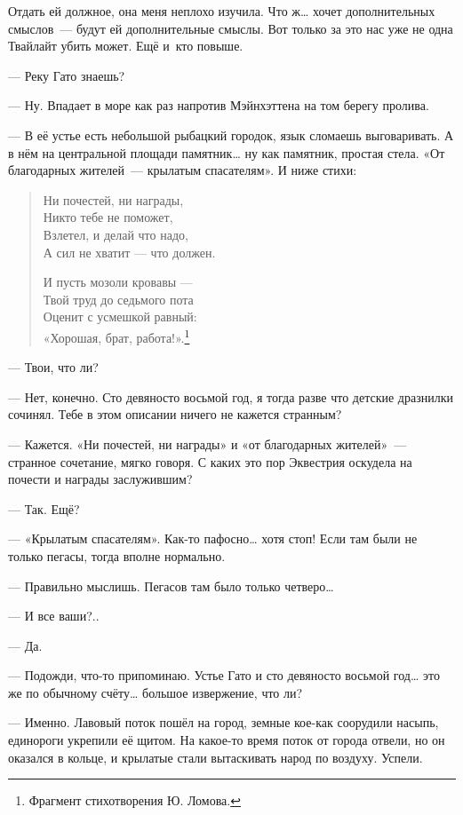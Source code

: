 \documentclass[fontsize=11pt,a5paper,titlepage=firstcover]{scrbook}
\begin{document}
Отдать ей должное, она меня неплохо изучила. Что ж{\ldots} хочет дополнительных смыслов~--- будут ей дополнительные смыслы. Вот только за это нас уже не одна Твайлайт убить может. Ещё и~кто повыше.

--- Реку Гато знаешь?

--- Ну. Впадает в море как раз напротив Мэйнхэттена на том берегу пролива.

--- В её устье есть небольшой рыбацкий городок, язык сломаешь выговаривать. А в нём на центральной площади памятник{\ldots} ну как памятник, простая стела. «От благодарных жителей~--- крылатым спасателям». И ниже стихи:

\begin{verse}
\textsf{Ни почестей, ни награды,\\
Никто тебе не поможет,\\
Взлетел, и делай что надо,\\
А сил не хватит --- что должен.}

\textsf{И пусть мозоли кровавы ---\\
Твой труд до седьмого пота\\
Оценит с усмешкой равный:\\
«Хорошая, брат, работа!».}\footnote{Фрагмент стихотворения Ю. Ломова.}
\end{verse}

--- Твои, что ли?

--- Нет, конечно. Сто девяносто восьмой год, я тогда разве что детские дразнилки сочинял. Тебе в этом описании ничего не кажется странным?

--- Кажется. «Ни почестей, ни награды» и «от благодарных жителей»~--- странное сочетание, мягко говоря. С каких это пор Эквестрия оскудела на почести и награды заслужившим?

--- Так. Ещё?

--- «Крылатым спасателям». Как-то пафосно{\ldots} хотя стоп! Если там были не только пегасы, тогда вполне нормально.

--- Правильно мыслишь. Пегасов там было только четверо{\ldots}

--- И все ваши?..

--- Да.

--- Подожди, что-то припоминаю. Устье Гато и сто девяносто восьмой год{\ldots} это же по обычному счёту{\ldots} большое извержение, что ли?

--- Именно. Лавовый поток пошёл на город, земные кое-как соорудили насыпь, единороги укрепили её щитом. На какое-то время поток от города отвели, но он оказался в кольце, и крылатые стали вытаскивать народ по воздуху. Успели.
\end{document}
